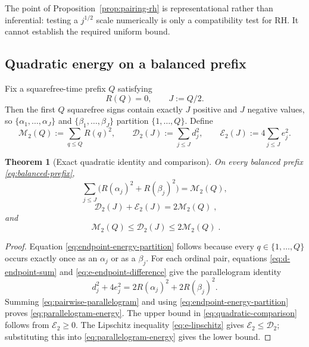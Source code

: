 \documentclass[11pt]{amsart}
\numberwithin{equation}{section}
\theoremstyle{plain}
\newtheorem{theorem}{Theorem}[section]
\theoremstyle{definition}
\theoremstyle{remark}
\begin{document}
The point of Proposition~\ref{prop:pairing-rh} is representational rather than
inferential: testing a $j^{1/2}$ scale numerically is only a compatibility test
for RH.  It cannot establish the required uniform bound.

\subsection{Quadratic energy on a balanced prefix}
\label{subsec:quadratic-energy}

Fix a squarefree-time prefix $Q$ satisfying
\begin{equation}
\label{eq:balanced-prefix}
R(Q)=0,
\qquad
J:=Q/2.
\end{equation}
Then the first $Q$ squarefree signs contain exactly $J$ positive and $J$
negative values, so $\{\alpha_1,\ldots,\alpha_J\}$ and
$\{\beta_1,\ldots,\beta_J\}$ partition $\{1,\ldots,Q\}$.  Define
\begin{equation}
\label{eq:quadratic-energies}
\mathcal M_2(Q):=\sum_{q\le Q}R(q)^2,
\qquad
\mathcal D_2(J):=\sum_{j\le J}d_j^2,
\qquad
\mathcal E_2(J):=4\sum_{j\le J}e_j^2.
\end{equation}

\begin{theorem}[Exact quadratic identity and comparison]
\label{thm:quadratic-pairing}
On every balanced prefix \eqref{eq:balanced-prefix},
\begin{equation}
\label{eq:endpoint-energy-partition}
\sum_{j\le J}\bigl(R(\alpha_j)^2+R(\beta_j)^2\bigr)
=\mathcal M_2(Q),
\end{equation}
\begin{equation}
\label{eq:parallelogram-energy}
\boxed{\;\mathcal D_2(J)+\mathcal E_2(J)=2\mathcal M_2(Q)\;},
\end{equation}
and
\begin{equation}
\label{eq:quadratic-comparison}
\boxed{\;\mathcal M_2(Q)\le\mathcal D_2(J)\le2\mathcal M_2(Q)\;}.
\end{equation}
\end{theorem}

\begin{proof}
Equation \eqref{eq:endpoint-energy-partition} follows because every
$q\in\{1,\ldots,Q\}$ occurs exactly once as an $\alpha_j$ or as a $\beta_j$.
For each ordinal pair, equations \eqref{eq:d-endpoint-sum} and
\eqref{eq:e-endpoint-difference} give the parallelogram identity
\begin{equation}
\label{eq:pairwise-parallelogram}
d_j^2+4e_j^2
=2R(\alpha_j)^2+2R(\beta_j)^2.
\end{equation}
Summing \eqref{eq:pairwise-parallelogram} and using
\eqref{eq:endpoint-energy-partition} proves
\eqref{eq:parallelogram-energy}.  The upper bound in
\eqref{eq:quadratic-comparison} follows from $\mathcal E_2\ge0$.  The
Lipschitz inequality \eqref{eq:e-lipschitz} gives
$\mathcal E_2\le\mathcal D_2$; substituting this into
\eqref{eq:parallelogram-energy} gives the lower bound.
\end{proof}
\end{document}
